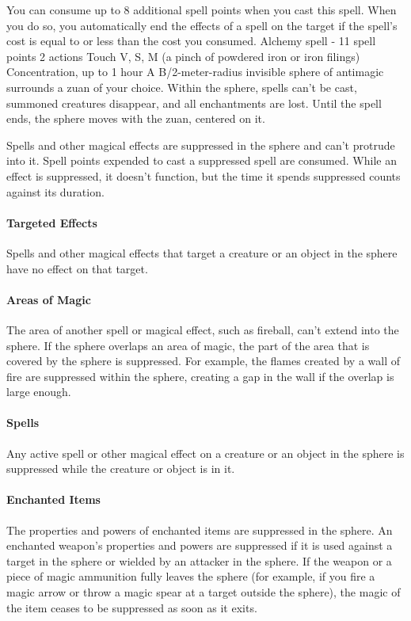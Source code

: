         You can consume up to 8 additional spell points when you cast this spell.
        When you do so, you automatically end the effects of a spell on the target if the spell's cost is equal to or less than the cost you consumed.
        {Alchemy spell - 11 spell points}
        {2 actions}
        {Touch}
        {V, S, M (a pinch of powdered iron or iron filings)}
        {Concentration, up to 1 hour}
        A B/2-meter-radius invisible sphere of antimagic surrounds a zuan of your choice.
        Within the sphere, spells can't be cast, summoned creatures disappear, and all enchantments are lost.
        Until the spell ends, the sphere moves with the zuan, centered on it.

        Spells and other magical effects are suppressed in the sphere and can't protrude into it.
        Spell points expended to cast a suppressed spell are consumed.
        While an effect is suppressed, it doesn't function, but the time it spends suppressed counts against its duration.

        \paragraph{Targeted Effects}
        Spells and other magical effects that target a creature or an object in the sphere have no effect on that target.

        \paragraph{Areas of Magic}
        The area of another spell or magical effect, such as fireball, can't extend into the sphere.
        If the sphere overlaps an area of magic, the part of the area that is covered by the sphere is suppressed.
        For example, the flames created by a wall of fire are suppressed within the sphere, creating a gap in the wall if the overlap is large enough.

        \paragraph{Spells}
        Any active spell or other magical effect on a creature or an object in the sphere is suppressed while the creature or object is in it.

        \paragraph{Enchanted Items}
        The properties and powers of enchanted items are suppressed in the sphere.
        An enchanted weapon's properties and powers are suppressed if it is used against a target in the sphere or wielded by an attacker in the sphere.
        If the weapon or a piece of magic ammunition fully leaves the sphere (for example, if you fire a magic arrow or throw a magic spear at a target outside the sphere), the magic of the item ceases to be suppressed as soon as it exits.

